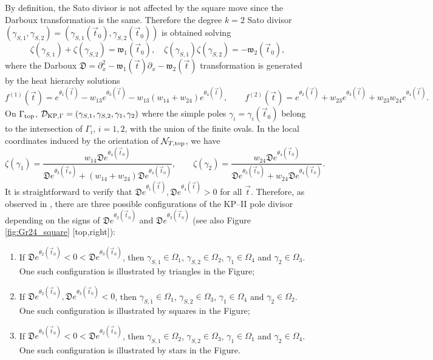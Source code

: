 \documentclass[11pt]{amsart}
\theoremstyle{plain}
\numberwithin{equation}{section}
\def \DKP {{\mathcal D}_{\textup{\scriptsize KP},\Gamma}}
\begin{document}
By definition, the Sato divisor is not affected by the square move since the Darboux transformation is the same.
Therefore the degree $k=2$ Sato divisor $(\gamma_{S,1} ,\gamma_{S,2} )=(\gamma_{S,1} (\vec t_0),\gamma_{S,2} (\vec t_0))$ is obtained solving
\begin{equation}\label{eq:ex_div_Sato_top}
\zeta(\gamma_{S,1}) +\zeta(\gamma_{S,2}) = {\mathfrak w}_1 (\vec t_0), \quad  \zeta(\gamma_{S,1})\zeta(\gamma_{S,2}) = -{\mathfrak w}_2 (\vec t_0), 
\end{equation}
where the Darboux $\mathfrak D = \partial_x^2 -{\mathfrak w}_1 (\vec t) \partial_x -{\mathfrak w}_2 (\vec t)$ transformation is generated by the heat hierarchy solutions
\[
f^{(1)} (\vec t) = e^{\theta_1(\vec t)}-w_{13} e^{\theta_3(\vec t)}-w_{13}(w_{14}+w_{24}) e^{\theta_4(\vec t)},\quad\quad
f^{(2)} (\vec t) = e^{\theta_2(\vec t)}+w_{23} e^{\theta_3(\vec t)}+w_{23}w_{24} e^{\theta_4(\vec t)}.
\]
On $\Gamma_{\mbox{\scriptsize top}}$, $\DKP = (\gamma_{S,1} ,\gamma_{S,2},\gamma_1,\gamma_2 )$
where the simple poles $\gamma_{i}=\gamma_{i} (\vec t_0)$ belong to the intersection of 
$\Gamma_{i}$, $i=1,2$, with the union of the finite ovals. In the local coordinates induced by the orientation of ${\mathcal N}_{T,{\mbox{\scriptsize top}}}$, we have
\begin{equation}\label{eq:ex_div_red}
\zeta(\gamma_{1}) = \frac{w_{14} {\mathfrak D} e^{\theta_4(\vec t_0)}}{{\mathfrak D} e^{\theta_3(\vec t_0)}+(w_{14}+ w_{24})
{\mathfrak D} e^{\theta_4(\vec t_0)}}, \quad\quad   \zeta(\gamma_{2}) = \frac{w_{24}{\mathfrak D} e^{\theta_4(\vec t_0)}}{{\mathfrak D} e^{\theta_3(\vec t_0)}+ w_{24}
{\mathfrak D} e^{\theta_4(\vec t_0)}}.
\end{equation}
It is straightforward to verify that ${\mathfrak D} e^{\theta_1(\vec t)}, {\mathfrak D} e^{\theta_4(\vec t)}>0$ for all $\vec t$.
Therefore, as observed in \cite{A2,AG2}, there are three possible configurations of the KP--II pole divisor depending on the signs of 
${\mathfrak D} e^{\theta_2(\vec t_0)}$ and ${\mathfrak D} e^{\theta_3(\vec t_0)}$ (see also Figure \ref{fig:Gr24_square} [top,right]):
\begin{enumerate}
\item If ${\mathfrak D} e^{\theta_2(\vec t_0)}<0<{\mathfrak D} e^{\theta_3(\vec t_0)}$, then $\gamma_{S,1} \in \Omega_1$, $\gamma_{S,2} \in \Omega_2$, $\gamma_{1} \in \Omega_4$ and $\gamma_{2} \in \Omega_3$. One such configuration is illustrated by triangles in the Figure;
\item If ${\mathfrak D} e^{\theta_2(\vec t_0)},{\mathfrak D} e^{\theta_3(\vec t_0)}<0$, then $\gamma_{S,1} \in \Omega_1$, $\gamma_{S,2} \in \Omega_3$, $\gamma_{1} \in \Omega_4$ and $\gamma_{2} \in \Omega_2$. One such configuration is illustrated by squares in the Figure;
\item If ${\mathfrak D} e^{\theta_3(\vec t_0)}<0<{\mathfrak D} e^{\theta_2(\vec t_0)}$, then $\gamma_{S,1} \in \Omega_2$, $\gamma_{S,2} \in \Omega_3$, $\gamma_{1} \in \Omega_1$ and $\gamma_{2} \in \Omega_4$. One such configuration is illustrated by stars in the Figure.
\end{enumerate}
\end{document}
